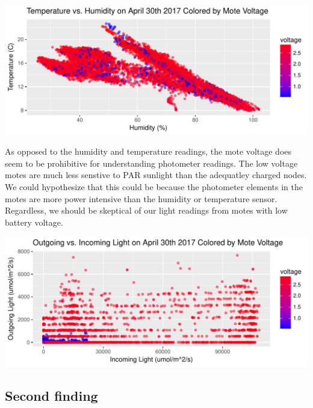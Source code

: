 \documentclass[english]{article}\usepackage[]{graphicx}\usepackage[]{color}
\makeatletter
\def\maxwidth{ %
  \ifdim\Gin@nat@width>\linewidth
    \linewidth
  \else
    \Gin@nat@width
  \fi
}
\newenvironment{knitrout}{}{} %
\makeatother
\begin{document}
\begin{knitrout}
\color{fgcolor}

{\centering \includegraphics[width=\maxwidth]{figure/q1p1-1} 

}



\end{knitrout}

As opposed to the humidity and temperature readings, the mote voltage does seem to
be prohibitive for understanding photometer readings.  The low voltage motes are much
less senstive to PAR sunlight than the adequatley charged nodes.  We could hypothesize that 
this could be because the photometer elements in the motes are
more power intensive than the humidity or temperature sensor.  Regardless, we should
be skeptical of our light readings from motes with low battery voltage.

\begin{knitrout}
\color{fgcolor}

{\centering \includegraphics[width=\maxwidth]{figure/q1p2-1} 

}



\end{knitrout}

\subsection{Second finding}
\end{document}
